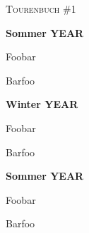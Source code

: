 \documentclass[
	  DIV=12
	, a4paper
	, fontsize=10pt
	, footinclude
	, headinclude
	, plainfootsepline
]{scrartcl}
\renewcommand{\labelitemi}{\color{skitour}$\blacktriangleright$\hspace{-0.6em}}
\renewcommand{\labelitemi}{\color{mtb}$\blacktriangleright$\hspace{-0.6em}}
\renewcommand{\labelitemi}{\color{wandern}$\blacktriangleright$\hspace{-0.6em}}
\begin{document}
\setdefaultleftmargin{0em}{0em}{1.87em}{1.7em}{1em}{1em}
\begin{center}
	\large \textsc{Tourenbuch \#1}
\end{center}

\begin{multicols}{2}
\begingroup
	\fontsize{6pt}{8pt}\selectfont
	{\footnotesize \textbf{Sommer YEAR}}
	\begin{compactitem}
		\item Foobar
		\item Barfoo
	\end{compactitem}
	\vspace{0.5em}

	{\footnotesize \textbf{Winter YEAR}}
	\renewcommand{\labelitemi}{\color{skitour}$\blacktriangleright$\hspace{-0.6em}}
	\begin{compactitem}
		\item Foobar
		\item Barfoo
	\end{compactitem}
	\vspace{0.5em}
	{\footnotesize \textbf{Sommer YEAR}}
	\begin{compactitem}
		\renewcommand{\labelitemi}{\color{wandern}$\blacktriangleright$\hspace{-0.6em}}
		\item Foobar
		\renewcommand{\labelitemi}{\color{mtb}$\blacktriangleright$\hspace{-0.6em}}
		\item Barfoo
	\end{compactitem}
\endgroup
\end{multicols}
\end{document}
